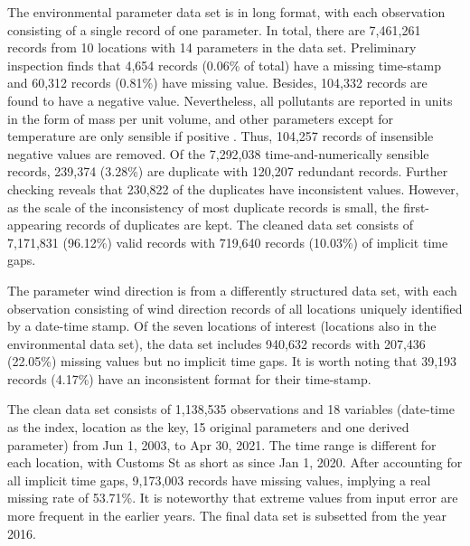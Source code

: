 \documentclass{aucklandthesis}
\begin{document}
The environmental parameter data set is in long format, with each observation consisting of a single record of one parameter. In total, there are 7,461,261 records from 10 locations with 14 parameters in the data set. Preliminary inspection finds that 4,654 records (0.06\% of total) have a missing time-stamp and 60,312 records (0.81\%) have missing value. Besides, 104,332 records are found to have a negative value. Nevertheless, all pollutants are reported in units in the form of mass per unit volume, and other parameters except for temperature are only sensible if positive \autocite{airunit}. Thus, 104,257 records of insensible negative values are removed. Of the 7,292,038 time-and-numerically sensible records, 239,374 (3.28\%) are duplicate with 120,207 redundant records. Further checking reveals that 230,822 of the duplicates have inconsistent values. However, as the scale of the inconsistency of most duplicate records is small, the first-appearing records of duplicates are kept. The cleaned data set consists of 7,171,831 (96.12\%) valid records with 719,640 records (10.03\%) of implicit time gaps.

The parameter wind direction is from a differently structured data set, with each observation consisting of wind direction records of all locations uniquely identified by a date-time stamp. Of the seven locations of interest (locations also in the environmental data set), the data set includes 940,632 records with 207,436 (22.05\%) missing values but no implicit time gaps. It is worth noting that 39,193 records (4.17\%) have an inconsistent format for their time-stamp.

The clean data set consists of 1,138,535 observations and 18 variables (date-time as the index, location as the key, 15 original parameters and one derived parameter) from Jun 1, 2003, to Apr 30, 2021. The time range is different for each location, with Customs St as short as since Jan 1, 2020. After accounting for all implicit time gaps, 9,173,003 records have missing values, implying a real missing rate of 53.71\%. It is noteworthy that extreme values from input error are more frequent in the earlier years. The final data set is subsetted from the year 2016.
\end{document}
